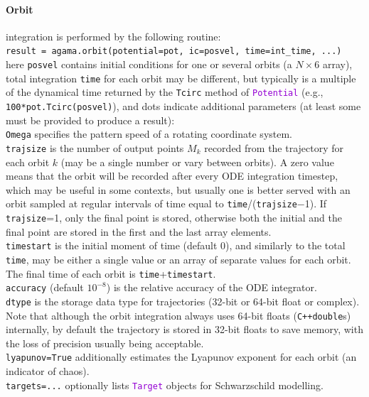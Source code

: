 \documentclass[12pt]{article}
\newcommand{\Cpp}  {\texttt{C++}\xspace}
\newcommand{\ttt}[1]{\textcolor{darkviolet}{\texttt{#1}}}
\newcommand{\ppp}[1]{\textcolor{darkolive} {\texttt{#1}}}
\begin{document}
\paragraph{Orbit} integration is performed by the following routine:\\
\texttt{result = agama.orbit(potential=pot, ic=posvel, time=int_time, ...)}\\
here \ppp{posvel} contains initial conditions for one or several orbits (a $N\times6$ array), total integration \ppp{time} for each orbit may be different, but typically is a multiple of the dynamical time returned by the \texttt{Tcirc} method of \ttt{Potential} (e.g., \texttt{100*pot.Tcirc(posvel)}), and dots indicate additional parameters (at least some must be provided to produce a result):\\
\ppp{Omega} specifies the pattern speed of a rotating coordinate system.\\
\ppp{trajsize} is the number of output points $M_k$ recorded from the trajectory for each orbit $k$ (may be a single number or vary between orbits). A zero value means that the orbit will be recorded after every ODE integration timestep, which may be useful in some contexts, but usually one is better served with an orbit sampled at regular intervals of time equal to \texttt{time}/(\texttt{trajsize}$-$1). If \texttt{trajsize}=1, only the final point is stored, otherwise both the initial and the final point are stored in the first and the last array elements.\\
\ppp{timestart} is the initial moment of time (default 0), and similarly to the total \texttt{time}, may be either a single value or an array of separate values for each orbit. The final time of each orbit is \texttt{time}+\texttt{timestart}.\\
\ppp{accuracy} (default $10^{-8}$) is the relative accuracy of the ODE integrator.\\
\ppp{dtype} is the storage data type for trajectories (32-bit or 64-bit float or complex). Note that although the orbit integration always uses 64-bit floats (\Cpp \texttt{double}s) internally, by default the trajectory is stored in 32-bit floats to save memory, with the loss of precision usually being acceptable.\\
\ppp{lyapunov=True} additionally estimates the Lyapunov exponent for each orbit (an indicator of chaos).\\
\ppp{targets=...} optionally lists \ttt{Target} objects for Schwarzschild modelling. \\[2mm]
\end{document}
